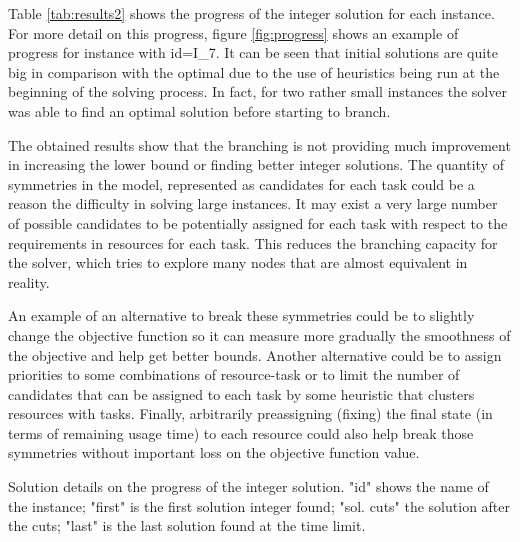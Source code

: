 \documentclass[a4paper,twocolumn,fleqn]{article}
\begin{document}
    Table \ref{tab:results2} shows the progress of the integer solution for each instance. For more detail on this progress, figure \ref{fig:progress} shows an example of progress for instance with id=I\_7. It can be seen that initial solutions are quite big in comparison with the optimal due to the use of heuristics being run at the beginning of the solving process. In fact, for two rather small instances the solver was able to find an optimal solution before starting to branch.

    The obtained results show that the branching is not providing much improvement in increasing the lower bound or finding better integer solutions. The quantity of symmetries in the model, represented as candidates for each task could be a reason the difficulty in solving large instances. It may exist a very large number of possible candidates to be potentially assigned for each task with respect to the requirements in resources for each task. This reduces the branching capacity for the solver, which tries to explore many nodes that are almost equivalent in reality.

    An example of an alternative to break these symmetries could be to slightly change the objective function so it can measure more gradually the smoothness of the objective and help get better bounds. Another alternative could be to assign priorities to some combinations of resource-task or to limit the number of candidates that can be assigned to each task by some heuristic that clusters resources with tasks. Finally, arbitrarily preassigning (fixing) the final state (in terms of remaining usage time) to each resource could also help break those symmetries without important loss on the objective function value.

    \begin{table}
    \begin{center}

    

    \caption{Solution details on the progress of the integer solution. "id" shows the name of the instance; "first" is the first solution integer found; "sol. cuts" the solution after the cuts; "last" is the last solution found at the time limit.}
    \vspace{-0.5cm}
    \label{tab:results2}
    \end{center}
    \end{table}
\end{document}
